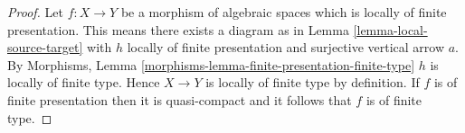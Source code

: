 \documentclass[10pt,a4paper]{amsart}
\theoremstyle{plain}
\theoremstyle{definition}
\theoremstyle{remark}
\numberwithin{equation}{subsection}
\begin{document}
\begin{proof}
Let $f : X \to Y$ be a morphism of algebraic spaces which is locally of
finite presentation. This means there exists a diagram as in
Lemma \ref{lemma-local-source-target}
with $h$ locally of finite presentation and surjective vertical arrow $a$. By
Morphisms, Lemma \ref{morphisms-lemma-finite-presentation-finite-type}
$h$ is locally of finite type.
Hence $X \to Y$ is locally of finite type by definition.
If $f$ is of finite presentation then it is quasi-compact and
it follows that $f$ is of finite type.
\end{proof}
\end{document}
